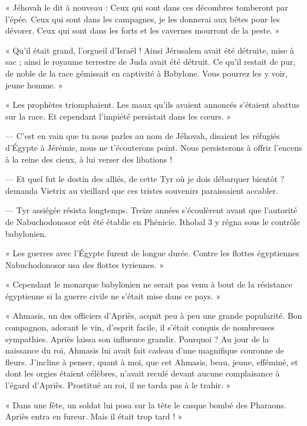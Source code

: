 \documentclass[a4paper, 11pt, oneside, polutonikogreek, french]{article}
\begin{document}
« Jéhovah le dit à nouveau : Ceux qui sont dans ces décombres tomberont par l'épée. Ceux qui sont dans les campagnes, je les donnerai aux bêtes pour les dévorer. Ceux qui sont dans les forts et les cavernes mourront de la peste. »

« Qu'il était grand, l'orgueil d'Israël ! Ainsi Jérusalem avait été détruite, mise à sac ; ainsi le royaume terrestre de Juda avait été détruit. Ce qu'il restait de pur, de noble de la race gémissait en captivité à Babylone. Vous pourrez les y voir, jeune homme. »

« Les prophètes triomphaient. Les maux qu'ils avaient annoncés s'étaient abattus sur la race. Et cependant l'impiété persistait dans les cœurs. »

--- C'est en vain que tu nous parles au nom de Jéhovah, disaient les réfugiés d'Égypte à Jérémie, nous ne t'écouterons point. Nous persisterons à offrir l'encens à la reine des cieux, à lui verser des libations !

\bigskip
\centerline{\EightStarTaper}
\centerline{\EightStarTaper\EightStarTaper}
\bigskip

--- Et quel fut le destin des alliés, de cette Tyr où je dois débarquer bientôt ? demanda Vietrix au vieillard que ces tristes souvenirs paraissaient accabler.

--- Tyr assiégée résista longtemps. Treize années s'écoulèrent avant que l'autorité de Nabuchodonosor eût été établie en Phénicie. Ithobal 3 y régna sous le contrôle babylonien.

« Les guerres avec l'Égypte furent de longue durée. Contre les flottes égyptiennes Nabuchodonosor usa des flottes tyriennes. »

« Cependant le monarque babylonien ne serait pas venu à bout de la résistance égyptienne si la guerre civile ne s'était mise dans ce pays. »

« Ahmasis, un des officiers d'Apriès, acquit peu à peu une grande popularité. Bon compagnon, adorant le vin, d'esprit facile, il s'était conquis de nombreuses sympathies. Apriès laissa son influence grandir. Pourquoi ? Au jour de la naissance du roi, Ahmasis lui avait fait cadeau d'une magnifique couronne de fleurs. J'incline à penser, quant à moi, que cet Ahmasis, beau, jeune, efféminé, et dont les orgies étaient célèbres, n'avait reculé devant aucune complaisance à l'égard d'Apriès. Prostitué au roi, il ne tarda pas à le trahir. »

« Dans une fête, un soldat lui posa sur la tête le casque bombé des Pharaons. Apriès entra en fureur. Mais il était trop tard ! »
\end{document}
